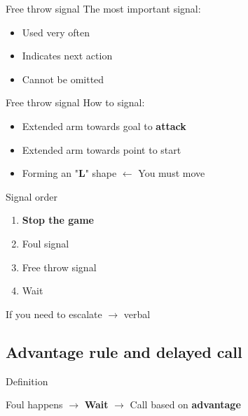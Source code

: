 \documentclass{beamer}
\begin{document}
    \begin{frame}{Free throw signal}
        The most important signal:
        \begin{itemize}
            \item Used very often
            \item Indicates next action
            \item Cannot be omitted
        \end{itemize}
    \end{frame}

    \begin{frame}{Free throw signal}
        How to signal:
        \begin{itemize}
            \item Extended arm towards goal to \textbf{attack}
            \item Extended arm towards point to start

            \pause

            \item Forming an "\textbf{L}" shape \pause $\leftarrow$ You must move
        \end{itemize}
    \end{frame}

    \begin{frame}{Signal order}
        \begin{enumerate}
            \item \textbf{Stop the game}\pause
            \item Foul signal
            \item Free throw signal
            \item Wait
        \end{enumerate}

        \pause

        If you need to escalate $\rightarrow$ verbal
    \end{frame}

    \subsection{Advantage rule and delayed call}

    \begin{frame}{Definition}
        \begin{center}
            Foul happens \pause
            $\rightarrow$ \textbf{Wait} \pause
            $\rightarrow$ Call based on \textbf{advantage}
        \end{center}
    \end{frame}
\end{document}

